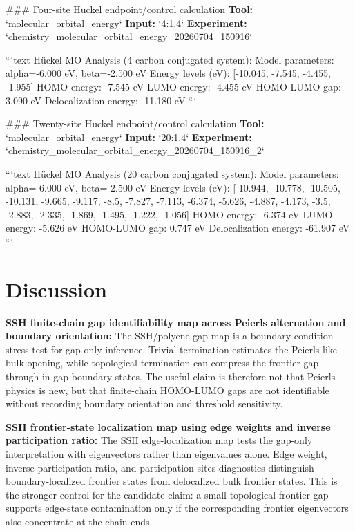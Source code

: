 \documentclass[11pt,a4paper]{article}
\begin{document}
\#\#\# Four-site Huckel endpoint/control calculation
\textbf{Tool:} `molecular\_orbital\_energy`
\textbf{Input:} `4:1.4`
\textbf{Experiment:} `chemistry\_molecular\_orbital\_energy\_20260704\_150916`

```text
Hückel MO Analysis (4 carbon conjugated system):
  Model parameters: alpha=-6.000 eV, beta=-2.500 eV
  Energy levels (eV): [-10.045, -7.545, -4.455, -1.955]
  HOMO energy: -7.545 eV
  LUMO energy: -4.455 eV
  HOMO-LUMO gap: 3.090 eV
  Delocalization energy: -11.180 eV
```

\#\#\# Twenty-site Huckel endpoint/control calculation
\textbf{Tool:} `molecular\_orbital\_energy`
\textbf{Input:} `20:1.4`
\textbf{Experiment:} `chemistry\_molecular\_orbital\_energy\_20260704\_150916\_2`

```text
Hückel MO Analysis (20 carbon conjugated system):
  Model parameters: alpha=-6.000 eV, beta=-2.500 eV
  Energy levels (eV): [-10.944, -10.778, -10.505, -10.131, -9.665, -9.117, -8.5, -7.827, -7.113, -6.374, -5.626, -4.887, -4.173, -3.5, -2.883, -2.335, -1.869, -1.495, -1.222, -1.056]
  HOMO energy: -6.374 eV
  LUMO energy: -5.626 eV
  HOMO-LUMO gap: 0.747 eV
  Delocalization energy: -61.907 eV
```


\section{Discussion}
\textbf{SSH finite-chain gap identifiability map across Peierls alternation and boundary orientation:} The SSH/polyene gap map is a boundary-condition stress test for gap-only inference. Trivial termination estimates the Peierls-like bulk opening, while topological termination can compress the frontier gap through in-gap boundary states. The useful claim is therefore not that Peierls physics is new, but that finite-chain HOMO-LUMO gaps are not identifiable without recording boundary orientation and threshold sensitivity.

\textbf{SSH frontier-state localization map using edge weights and inverse participation ratio:} The SSH edge-localization map tests the gap-only interpretation with eigenvectors rather than eigenvalues alone. Edge weight, inverse participation ratio, and participation-sites diagnostics distinguish boundary-localized frontier states from delocalized bulk frontier states. This is the stronger control for the candidate claim: a small topological frontier gap supports edge-state contamination only if the corresponding frontier eigenvectors also concentrate at the chain ends.
\end{document}
